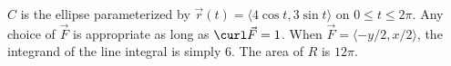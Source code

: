 {$C$ is the ellipse parameterized by $\vec r(t) = \langle 4\cos t,3\sin t\rangle$ on $0\leq t\leq 2\pi$. 
}
{Any choice of $\vec F$ is appropriate as long as $\curl \vec F = 1$. When $\vec F = \langle -y/2,x/2\rangle$, the integrand of the line integral is simply 6. The area of $R$ is $12\pi$.
}

